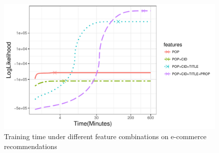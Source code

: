 \begin{figure}[htb]
\includegraphics[width=0.9\columnwidth,height=0.5\columnwidth]{fig/Lik_time}
\caption{Training time under different feature combinations on e-commerce recommendations}
\label{fig:train_time_cmp}
\end{figure}



